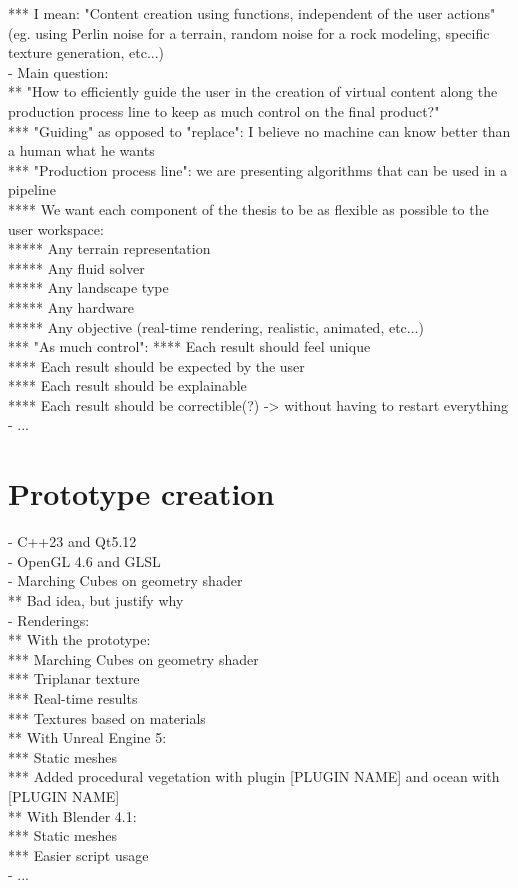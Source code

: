 *** I mean: "Content creation using functions, independent of the user actions" (eg. using Perlin noise for a terrain, random noise for a rock modeling, specific texture generation, etc...) \\
- Main question: \\
** "How to efficiently guide the user in the creation of virtual content along the production process line to keep as much control on the final product?" \\
*** "Guiding" as opposed to "replace": I believe no machine can know better than a human what he wants \\
*** "Production process line": we are presenting algorithms that can be used in a pipeline \\
**** We want each component of the thesis to be as flexible as possible to the user workspace: \\
***** Any terrain representation \\
***** Any fluid solver \\
***** Any landscape type \\
***** Any hardware \\
***** Any objective (real-time rendering, realistic, animated, etc...) \\
*** "As much control": 
**** Each result should feel unique \\
**** Each result should be expected by the user \\
**** Each result should be explainable \\
**** Each result should be correctible(?) -> without having to restart everything \\
- ...

\section{Prototype creation}
\label{sec:introduction_prototype}
- C++23 and Qt5.12 \\
- OpenGL 4.6 and GLSL \\
- Marching Cubes on geometry shader \\
** Bad idea, but justify why \\
- Renderings: \\
** With the prototype: \\
*** Marching Cubes on geometry shader \\
*** Triplanar texture \\
*** Real-time results \\
*** Textures based on materials \\
** With Unreal Engine 5: \\
*** Static meshes \\
*** Added procedural vegetation with plugin [PLUGIN NAME] and ocean with [PLUGIN NAME] \\
** With Blender 4.1: \\
*** Static meshes \\
*** Easier script usage \\
- ...

